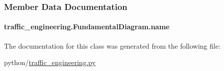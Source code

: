 \subsubsection{Member Data Documentation}
\hypertarget{classtraffic__engineering_1_1FundamentalDiagram_a83c90c78828bc2fb7b608e97e29b436c}{
\paragraph[{name}]{\setlength{\rightskip}{0pt plus 5cm}traffic\-\_\-engineering.\-Fundamental\-Diagram.\-name}}\label{classtraffic__engineering_1_1FundamentalDiagram_a83c90c78828bc2fb7b608e97e29b436c}


The documentation for this class was generated from the following file\-:\begin{DoxyCompactItemize}
\item 
python/\hyperlink{traffic__engineering_8py}{traffic\-\_\-engineering.\-py}\end{DoxyCompactItemize}
